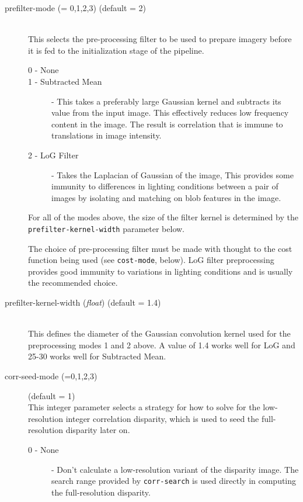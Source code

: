 \begin{description}

\item[prefilter-mode \textnormal{\small{(= 0,1,2,3)}} (default = 2)] \hfill \\
  This selects the pre-processing filter to be used to prepare imagery
  before it is fed to the initialization stage of the pipeline.

  \begin{description}
    \item[0 - None]
    \item[1 - Subtracted Mean] - This takes a preferably large
      Gaussian kernel and subtracts its value from the input
      image. This effectively reduces low frequency content in the
      image. The result is correlation that is immune to translations
      in image intensity.
    \item[2 - LoG Filter] - Takes the Laplacian of Gaussian of the
      image, This provides some immunity to differences in lighting
      conditions between a pair of images by isolating and matching on
      blob features in the image.
  \end{description}

  For all of the modes above, the size of the filter kernel is
  determined by the \texttt{prefilter-kernel-width} parameter below.

  The choice of pre-processing filter must be made with thought to the
  cost function being used (see \texttt{cost-mode}, below).  LoG filter
  preprocessing provides good immunity to variations in lighting
  conditions and is usually the recommended choice.

\item[prefilter-kernel-width \textnormal{\small{(\emph{float})}} (default = 1.4)] \hfill \\
  This defines the diameter of the Gaussian convolution kernel used
  for the preprocessing modes 1 and 2 above. A value of 1.4 works
  well for LoG and 25-30 works well for Subtracted Mean.

\item[corr-seed-mode \textnormal{\small{(=0,1,2,3)}}] (default = 1) \hfill \\
  This integer parameter selects a strategy for how to solve for the
  low-resolution integer correlation disparity, which is used to seed
  the full-resolution disparity later on.

  \begin{description}
  \item[0 - None] - Don't calculate a low-resolution variant of the
    disparity image. The search range provided by \texttt{corr-search}
    is used directly in computing the full-resolution disparity.


\end{description}
\end{description}
